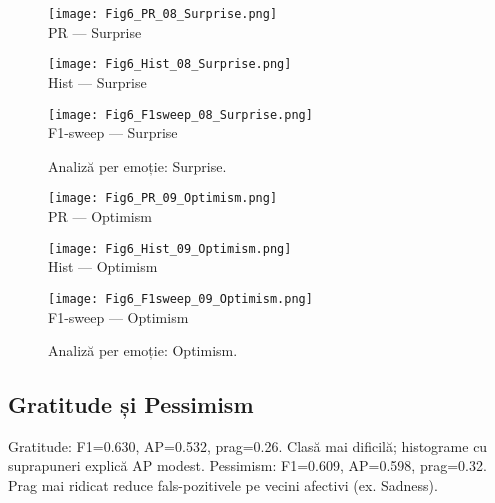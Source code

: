 \begin{figure}[H]
  \centering
  \begin{minipage}[t]{0.32\textwidth}\centering
    \texttt{[image: Fig6\_PR\_08\_Surprise.png]}\\[-1mm]
    {\scriptsize PR — Surprise}
  \end{minipage}\hfill
  \begin{minipage}[t]{0.32\textwidth}\centering
    \texttt{[image: Fig6\_Hist\_08\_Surprise.png]}\\[-1mm]
    {\scriptsize Hist — Surprise}
  \end{minipage}\hfill
  \begin{minipage}[t]{0.32\textwidth}\centering
    \texttt{[image: Fig6\_F1sweep\_08\_Surprise.png]}\\[-1mm]
    {\scriptsize F1-sweep — Surprise}
  \end{minipage}
  \caption{Analiză per emoție: Surprise.}
  \label{fig:c6-surprise}
\end{figure}

\begin{figure}[H]
  \centering
  \begin{minipage}[t]{0.32\textwidth}\centering
    \texttt{[image: Fig6\_PR\_09\_Optimism.png]}\\[-1mm]
    {\scriptsize PR — Optimism}
  \end{minipage}\hfill
  \begin{minipage}[t]{0.32\textwidth}\centering
    \texttt{[image: Fig6\_Hist\_09\_Optimism.png]}\\[-1mm]
    {\scriptsize Hist — Optimism}
  \end{minipage}\hfill
  \begin{minipage}[t]{0.32\textwidth}\centering
    \texttt{[image: Fig6\_F1sweep\_09\_Optimism.png]}\\[-1mm]
    {\scriptsize F1-sweep — Optimism}
  \end{minipage}
  \caption{Analiză per emoție: Optimism.}
  \label{fig:c6-optimism}
\end{figure}

\subsection{Gratitude și Pessimism}
\noindent Gratitude: F1=0.630, AP=0.532, prag=0.26. Clasă mai dificilă; histograme cu suprapuneri explică AP modest.
\noindent Pessimism: F1=0.609, AP=0.598, prag=0.32. Prag mai ridicat reduce fals-pozitivele pe vecini afectivi (ex. Sadness).

